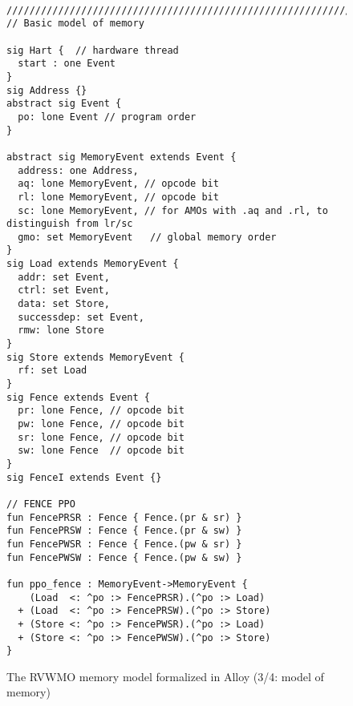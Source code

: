 \begin{figure}[h!]
  {
  \tt\bfseries\centering\footnotesize
  \begin{lstlisting}
////////////////////////////////////////////////////////////////////////////////
// Basic model of memory

sig Hart {  // hardware thread
  start : one Event
}
sig Address {}
abstract sig Event {
  po: lone Event // program order
}

abstract sig MemoryEvent extends Event {
  address: one Address,
  aq: lone MemoryEvent, // opcode bit
  rl: lone MemoryEvent, // opcode bit
  sc: lone MemoryEvent, // for AMOs with .aq and .rl, to distinguish from lr/sc
  gmo: set MemoryEvent   // global memory order
}
sig Load extends MemoryEvent {
  addr: set Event,
  ctrl: set Event,
  data: set Store,
  successdep: set Event,
  rmw: lone Store
}
sig Store extends MemoryEvent {
  rf: set Load
}
sig Fence extends Event {
  pr: lone Fence, // opcode bit
  pw: lone Fence, // opcode bit
  sr: lone Fence, // opcode bit
  sw: lone Fence  // opcode bit
}
sig FenceI extends Event {}

// FENCE PPO
fun FencePRSR : Fence { Fence.(pr & sr) }
fun FencePRSW : Fence { Fence.(pr & sw) }
fun FencePWSR : Fence { Fence.(pw & sr) }
fun FencePWSW : Fence { Fence.(pw & sw) }

fun ppo_fence : MemoryEvent->MemoryEvent {
    (Load  <: ^po :> FencePRSR).(^po :> Load)
  + (Load  <: ^po :> FencePRSW).(^po :> Store)
  + (Store <: ^po :> FencePWSR).(^po :> Load)
  + (Store <: ^po :> FencePWSW).(^po :> Store)
}
\end{lstlisting}}
  \caption{The RVWMO memory model formalized in Alloy (3/4: model of memory)}
  \label{fig:alloy3}
\end{figure}
